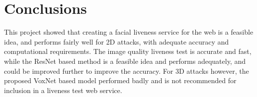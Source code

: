 \documentclass[10pt,a4paper]{article}
\begin{document}
\section{Conclusions}
    This project showed that creating a facial liveness service for the web is a feasible idea, and performs fairly well for 2D attacks, with adequate accuracy and computational requirements.
    The image quality liveness test is accurate and fast, while the ResNet based method is a feasible idea and performs adequately, and could be improved further to improve the accuracy. For 3D attacks however, the
    proposed VoxNet based model performed badly and is not recommended for inclusion in a liveness test web service.


\printglossary


\end{document}

